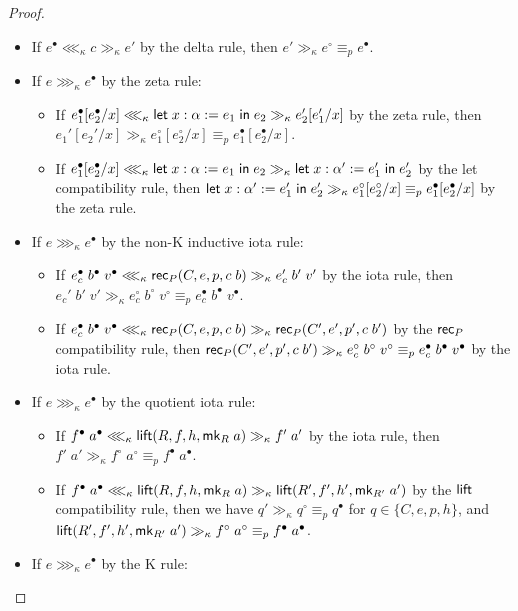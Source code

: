 \begin{proof}
\begin{itemize}
\begin{itemize}
\end{itemize}
\item If $e^\bullet\lll_\kappa c\gg_\kappa e'$ by the delta rule, then $e'\gg_\kappa e^\circ\equiv_p e^\bullet$.
\item If $e\ggg_\kappa e^\bullet$ by the zeta rule:
\begin{itemize}
\item If $e_1^\bullet[e_2^\bullet/x]\lll_\kappa\mathsf{let}\;x:\alpha:=e_1\mathrel{\mathsf{in}}e_2\gg_\kappa e_2'[e_1'/x]$ by the zeta rule, then $e_1'[e_2'/x]\gg_\kappa e_1^\circ[e_2^\circ/x]\equiv_p e_1^\bullet[e_2^\bullet/x]$.
\item If $e_1^\bullet[e_2^\bullet/x]\lll_\kappa\mathsf{let}\;x:\alpha:=e_1\mathrel{\mathsf{in}}e_2\gg_\kappa \mathsf{let}\;x:\alpha':=e_1'\mathrel{\mathsf{in}}e_2'$ by the let compatibility rule, then $\mathsf{let}\;x:\alpha':=e_1'\mathrel{\mathsf{in}}e_2'\gg_\kappa e_1^\circ[e_2^\circ/x]\equiv_p e_1^\bullet[e_2^\bullet/x]$ by the zeta rule.
\end{itemize}
\item If $e\ggg_\kappa e^\bullet$ by the non-K inductive iota rule:
\begin{itemize}
\item If $e_c^\bullet\;b^\bullet\;v^\bullet\lll_\kappa \mathsf{rec}_P(C,e,p,c\;b)\gg_\kappa e_c'\;b'\;v'$ by the iota rule, then $e_c'\;b'\;v'\gg_\kappa e_c^\circ\;b^\circ\;v^\circ\equiv_p e_c^\bullet\;b^\bullet\;v^\bullet$.
\item If $e_c^\bullet\;b^\bullet\;v^\bullet\lll_\kappa \mathsf{rec}_P(C,e,p,c\;b)\gg_\kappa \mathsf{rec}_P(C',e',p',c\;b')$ by the $\mathsf{rec}_P$ compatibility rule, then $\mathsf{rec}_P(C',e',p',c\;b')\gg_\kappa e_c^\circ\;b^\circ\;v^\circ\equiv_p e_c^\bullet\;b^\bullet\;v^\bullet$ by the iota rule.
\end{itemize}
\item If $e\ggg_\kappa e^\bullet$ by the quotient iota rule:
\begin{itemize}
\item If $f^\bullet\;a^\bullet\lll_\kappa \mathsf{lift}(R,f,h,\mathsf{mk}_R\;a)\gg_\kappa f'\;a'$ by the iota rule, then $f'\;a'\gg_\kappa f^\circ\;a^\circ\equiv_p f^\bullet\;a^\bullet$.
\item If $f^\bullet\;a^\bullet\lll_\kappa \mathsf{lift}(R,f,h,\mathsf{mk}_R\;a)\gg_\kappa\mathsf{lift}(R',f',h',\mathsf{mk}_{R'}\;a')$ by the $\mathsf{lift}$ compatibility rule, then we have $q'\gg_\kappa q^\circ\equiv_p q^\bullet$ for $q\in\{C,e,p,h\}$, and $\mathsf{lift}(R',f',h',\mathsf{mk}_{R'}\;a')\gg_\kappa f^\circ\;a^\circ\equiv_p f^\bullet\;a^\bullet$.
\end{itemize}
\item If $e\ggg_\kappa e^\bullet$ by the K rule:

\end{itemize}
\end{proof}
